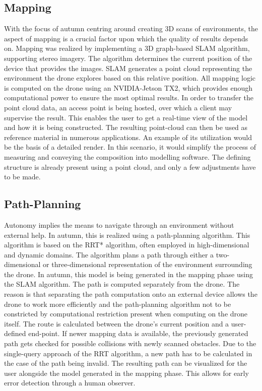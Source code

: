 \subsection{Mapping}
With the focus of autumn centring around creating 3D scans of environments, the aspect of mapping is a crucial factor upon which the quality of results depends on.\newline
Mapping was realized by implementing a 3D graph-based SLAM algorithm, supporting stereo imagery. The algorithm determines the current position of the device that provides the images. SLAM generates a point cloud representing the environment the drone explores based on this relative position. All mapping logic is computed on the drone using an NVIDIA-Jetson TX2, which provides enough computational power to ensure the most optimal results. In order to transfer the point cloud data, an access point is being hosted, over which a client may supervise the result. This enables the user to get a real-time view of the model and how it is being constructed. The resulting point-cloud can then be used as reference material in numerous applications.\newline
An example of its utilization would be the basis of a detailed render. In this scenario, it would simplify the process of measuring and conveying the composition into modelling software. The defining structure is already present using a point cloud, and only a few adjustments have to be made.

\subsection{Path-Planning}
Autonomy implies the means to navigate through an environment without external help. In autumn, this is realized using a path-planning algorithm. This algorithm is based on the RRT* algorithm, often employed in high-dimensional and dynamic domains. The algorithm plans a path through either a two-dimensional or three-dimensional representation of the environment surrounding the drone. In autumn, this model is being generated in the mapping phase using the SLAM algorithm.\newline
The path is computed separately from the drone. The reason is that separating the path computation onto an external device allows the drone to work more efficiently and the path-planning algorithm not to be constricted by computational restriction present when computing on the drone itself.\newline
The route is calculated between the drone's current position and a user-defined end-point. If newer mapping data is available, the previously generated path gets checked for possible collisions with newly scanned obstacles. Due to the single-query approach of the RRT algorithm, a new path has to be calculated in the case of the path being invalid.
The resulting path can be visualized for the user alongside the model generated in the mapping phase. This allows for early error detection through a human observer.

